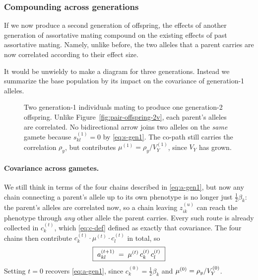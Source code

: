\documentclass[12pt]{article}
\begin{document}
\subsubsection{Compounding across generations}
If we now produce a second generation of offspring, the effects of another generation of assortative mating compound on the existing effects of past assortative mating.
Namely, unlike before, the two alleles that a parent carries are now correlated according to their effect size.

It would be unwieldy to make a diagram for three generations.
Instead we summarize the base population by its impact on the covariance of generation-1 alleles.

\begin{figure}
    \begin{floatcard}
        
        \caption{%
            Two generation-1 individuals mating to produce one generation-2 offspring.
            Unlike Figure~\ref{fig:pair-offspring-2v}, each parent's alleles are correlated.
            No bidirectional arrow joins two alleles on the \emph{same} gamete because $s^{(1)}_{kl} = 0$ by \eqref{eq:s-gen1}.
            The co-path still carries the correlation $\rho_y$, but contributes $\mu^{(1)} = \rho_y/V_Y^{(1)}$, since $V_Y$ has grown.%
        }
        \label{fig:reduced}
    \end{floatcard}
\end{figure}

\paragraph{Covariance across gametes.}
We still think in terms of the four chains described in \eqref{eq:a-gen1}, but now any chain connecting a parent's allele up to its own phenotype is no longer just $\tfrac12\beta_k$: the parent's alleles are correlated now, so a chain leaving $z^{(u)}_{ik}$ can reach the phenotype through \emph{any} other allele the parent carries.
Every such route is already collected in $c^{(t)}_k$, which \eqref{eq:c-def} defined as exactly that covariance.
The four chains then contribute $c^{(t)}_k \cdot \mu^{(t)} \cdot c^{(t)}_l$ in total, so
\begin{equation}\label{eq:a-recursion}
    \boxed{\ a^{(t+1)}_{kl} \;=\; \mut\, c^{(t)}_k\, c^{(t)}_l \ }
\end{equation}
Setting $t=0$ recovers \eqref{eq:a-gen1}, since $c^{(0)}_k = \tfrac12\beta_k$ and $\mu^{(0)} = \rho_y/V_Y^{(0)}$.
\end{document}
